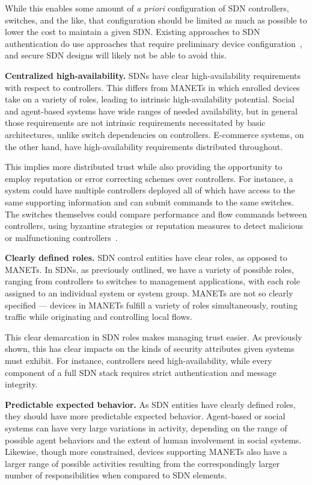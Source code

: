 \documentclass[10pt,conference]{IEEEtran}
\begin{document}
While this enables some amount of {\sl a priori} configuration of SDN controllers, switches, and the like, that configuration should be limited as much as possible to lower the cost to maintain a given SDN.  Existing approaches to SDN authentication do use approaches that require preliminary device configuration~\cite{CaFrPeLu:07}, and secure SDN designs will likely not be able to avoid this.

\noindent
{\bf Centralized high-availability.} SDNs have clear high-availability requirements with respect to controllers.  This differs from MANETs in which enrolled devices take on a variety of roles, leading to intrinsic high-availability potential.  Social and agent-based systems have wide ranges of needed availability, but in general those requirements are not intrinsic requirements necessitated by basic architectures, unlike switch dependencies on controllers.  E-commerce systems, on the other hand, have high-availability requirements distributed throughout.

This implies more distributed trust while also providing the opportunity to employ reputation or error correcting schemes over controllers.  For instance, a system could have multiple controllers deployed all of which have access to the same supporting information and can submit commands to the same switches.  The switches themselves could compare performance and flow commands between controllers, using byzantine strategies or reputation measures to detect malicious or malfunctioning controllers~\cite{FeMi:88, TaKaCh:11}.

\noindent
{\bf Clearly defined roles.} SDN control entities have clear roles, as opposed to MANETs.  In SDNs, as previously outlined, we have a variety of possible roles, ranging from controllers to switches to management applications, with each role assigned to an individual system or system group.  MANETs are not so clearly specified --- devices in MANETs fulfill a variety of roles simultaneously, routing traffic while originating and controlling local flows.

This clear demarcation in SDN roles makes managing trust easier.  As previously shown, this has clear impacts on the kinds of security attributes given systems must exhibit.  For instance, controllers need high-availability, while every component of a full SDN stack requires strict authentication and message integrity.

\noindent
{\bf Predictable expected behavior.} As SDN entities have clearly defined roles, they should have more predictable expected behavior.  Agent-based or social systems can have very large variations in activity, depending on the range of possible agent behaviors and the extent of human involvement in social systems.  Likewise, though more constrained, devices supporting MANETs also have a larger range of possible activities resulting from the correspondingly larger number of responsibilities when compared to SDN elements.
\end{document}
